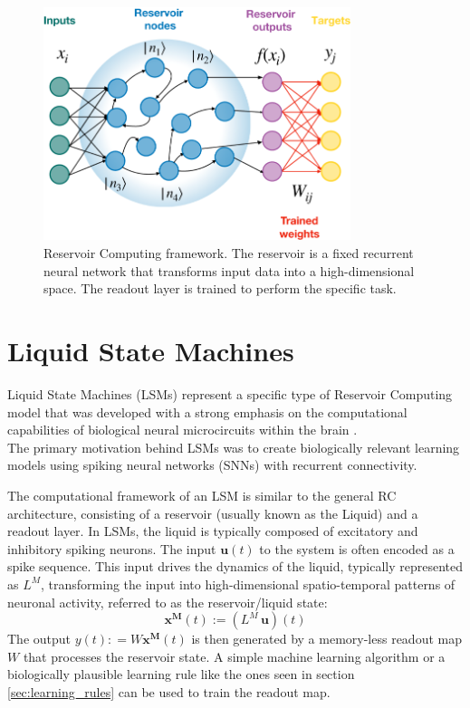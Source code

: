 \documentclass[a4paper,12pt]{report}
\begin{document}
\begin{figure}[h!]
    \centering
    \includegraphics[width=0.8\textwidth]{pictures/RC_picture.png}
    \caption{Reservoir Computing framework. The reservoir is a fixed recurrent neural 
    network that transforms input data into a high-dimensional space. The readout layer 
    is trained to perform the specific task.}
    \label{fig:rc_framework}
\end{figure}

\section{Liquid State Machines}
Liquid State Machines (LSMs) represent a specific type of Reservoir Computing model that 
was developed with a strong emphasis on the computational capabilities of biological 
neural microcircuits within the brain \cite{Maass2002, Maass2004, Maass2011}.\\
The primary motivation behind LSMs was to create biologically relevant learning models 
using spiking neural networks (SNNs) with recurrent connectivity.
\vspace{0.5em}

The computational framework of an LSM is similar to the general RC architecture, 
consisting of a reservoir (usually known as the Liquid) and a readout layer. In LSMs, 
the liquid is typically composed of excitatory and inhibitory spiking neurons. 
The input $\mathbf{u}(t)$ to the system is often encoded as a spike sequence. This input drives the 
dynamics of the liquid, typically represented as $L^M$, transforming the input into high-dimensional 
spatio-temporal patterns of neuronal activity, referred to as the reservoir/liquid state: 
$$ \mathbf{x^M}(t) := (L^M\,\mathbf{u})(t)$$ 
The output $ y(t) : = W\mathbf{x^M}(t)$ is then generated by a memory-less readout map $W$ 
that processes the reservoir state. 
A simple machine learning algorithm or a biologically plausible learning rule like the 
ones seen in section \ref{sec:learning_rules} can be used to train the readout map.
\end{document}
